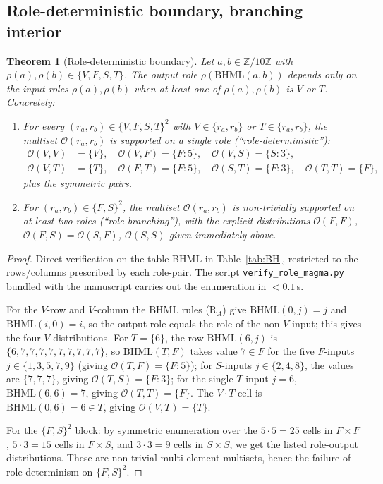 \documentclass[11pt,reqno]{amsart}
\theoremstyle{plain}
\newtheorem{theorem}{Theorem}[section]
\theoremstyle{definition}
\theoremstyle{remark}
\newcommand{\Z}{\mathbb{Z}}
\newcommand{\BH}{\mathrm{BHML}}
\newcommand{\Zten}{\Z/10\Z}
\begin{document}
\subsection{Role-deterministic boundary, branching interior}

\begin{theorem}[Role-deterministic boundary]
\label{thm:semi-fact}
Let $a, b \in \Zten$ with $\rho(a), \rho(b) \in \{V, F, S, T\}$.
The output role $\rho(\BH(a, b))$ depends only on the input
roles $\rho(a), \rho(b)$ when at least one of $\rho(a), \rho(b)$
is $V$ or $T$. Concretely:
\begin{enumerate}\setlength\itemsep{2pt}
\item For every $(r_a, r_b) \in \{V, F, S, T\}^2$ with
$V \in \{r_a, r_b\}$ or $T \in \{r_a, r_b\}$, the multiset
$\mathcal{O}(r_a, r_b)$ is supported on a single role
(``role-deterministic''):
\begin{align*}
\mathcal{O}(V, V) &= \{V\}, \quad
\mathcal{O}(V, F) = \{F : 5\}, \quad
\mathcal{O}(V, S) = \{S : 3\}, \\
\mathcal{O}(V, T) &= \{T\}, \quad
\mathcal{O}(F, T) = \{F : 5\}, \quad
\mathcal{O}(S, T) = \{F : 3\}, \quad
\mathcal{O}(T, T) = \{F\},
\end{align*}
plus the symmetric pairs.

\item For $(r_a, r_b) \in \{F, S\}^2$, the multiset
$\mathcal{O}(r_a, r_b)$ is non-trivially supported on at least
two roles (``role-branching''), with the explicit distributions
$\mathcal{O}(F, F)$, $\mathcal{O}(F, S) = \mathcal{O}(S, F)$,
$\mathcal{O}(S, S)$ given immediately above.
\end{enumerate}
\end{theorem}

\begin{proof}
Direct verification on the table $\BH$ in Table~\ref{tab:BH},
restricted to the rows/columns prescribed by each role-pair.
The script \texttt{verify\_role\_magma.py} bundled with the
manuscript carries out the enumeration in $<0.1$\,s.

For the $V$-row and $V$-column the $\BH$ rules (R$_A$) give
$\BH(0, j) = j$ and $\BH(i, 0) = i$, so the output role equals
the role of the non-$V$ input; this gives the four $V$-distributions.
For $T = \{6\}$, the row $\BH(6, j)$ is $\{6, 7, 7, 7, 7, 7, 7,
7, 7, 7\}$, so $\BH(T, F)$ takes value $7 \in F$ for the five
$F$-inputs $j \in \{1, 3, 5, 7, 9\}$ (giving $\mathcal{O}(T, F)
= \{F : 5\}$); for $S$-inputs $j \in \{2, 4, 8\}$, the values are
$\{7, 7, 7\}$, giving $\mathcal{O}(T, S) = \{F : 3\}$; for the
single $T$-input $j = 6$, $\BH(6, 6) = 7$, giving
$\mathcal{O}(T, T) = \{F\}$. The $V \cdot T$ cell is $\BH(0, 6)
= 6 \in T$, giving $\mathcal{O}(V, T) = \{T\}$.

For the $\{F, S\}^2$ block: by symmetric enumeration over the
$5 \cdot 5 = 25$ cells in $F \times F$, $5 \cdot 3 = 15$ cells in
$F \times S$, and $3 \cdot 3 = 9$ cells in $S \times S$, we get
the listed role-output distributions. These are non-trivial
multi-element multisets, hence the failure of role-determinism on
$\{F, S\}^2$.
\end{proof}
\end{document}
